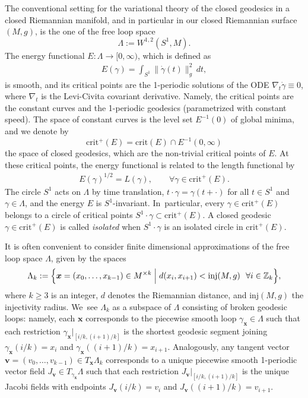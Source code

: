 \documentclass[JEP,XML,SOM,Unicode,NoFloatCountersInSection,published]{cedram}
\let\bm\boldsymbol
\newcommand{\Z}{\mathbb{Z}}
\newcommand{\xx}{\bm{x}}
\newcommand{\vv}{\bm{v}}
\newcommand{\crit}{\mathrm{crit}}
\newcommand{\inj}{\mathrm{inj}}
\theoremstyle{plain}
\theoremstyle{definition}
\begin{document}
The conventional setting for the variational theory of the closed geodesics in a closed Riemannian manifold, and in particular in our closed Riemannian surface $(M,g)$, is the one of the free loop space \[
\Lambda:=W^{1,2}(S^1,M).
\] The energy functional $E:\Lambda\to[0,\infty)$, which is defined as
\begin{align*}
E(\gamma)=\int_{S^1} \|\dot\gamma(t)\|_g^2\,dt,
\end{align*}
is smooth, and its critical points are the 1-periodic solutions of the ODE $\nabla_t\dot\gamma\equiv0$, where $\nabla_t$ is the Levi-Civita covariant derivative. Namely, the critical points are the constant curves and the 1-periodic geodesics (parametrized with constant speed).
The space of constant curves is the level set $E^{-1}(0)$ of global minima, and we denote by \[
\crit^+(E)=\crit(E)\cap E^{-1}(0,\infty)
\] the space of closed geodesics, which are the non-trivial critical points of $E$.
At these critical points, the energy functional is related to the length functional by
\begin{align*}
E(\gamma)^{1/2}=L(\gamma),\qquad\forall \gamma\in\crit^+(E).
\end{align*}
The circle $S^1$ acts on $\Lambda$ by time translation, \ie $t\cdot\gamma=\gamma(t+\cdot)$ for all $t\in S^1$ and $\gamma\in\Lambda$, and the energy $E$ is $S^1$-invariant. In~particular, every $\gamma\in\crit^+(E)$ belongs to a circle of critical points $S^1\cdot\gamma\subset\crit^+(E)$. A closed geodesic $\gamma\in\crit^+(E)$ is called \emph{isolated} when $S^1\cdot\gamma$ is an isolated circle in $\crit^+(E)$.

It is often convenient to consider finite dimensional approximations of the free loop space $\Lambda$, given by the spaces
\begin{align*}
\Lambda_k:=\Big\{ \xx=(x_0,\dots,x_{k-1})\in M^{\times k}\Bigm|d(x_i,x_{i+1})<\inj(M,g)\ \ \forall i\in\Z_k \Big\},
\end{align*}
where $k\geq 3$ is an integer, $d$ denotes the Riemannian distance, and $\inj(M,g)$ the injectivity radius. We~see $\Lambda_k$ as a subspace of $\Lambda$ consisting of broken geodesic loops: namely, each $\xx$ corresponds to the piecewise smooth loop $\gamma_{\xx}\in\Lambda$ such that each restriction $\gamma_{\xx}|_{[i/k,(i+1)/k]}$ is the shortest geodesic segment joining $\gamma_{\xx}(i/k)=x_i$ and $\gamma_{\xx}((i+1)/k)=x_{i+1}$. Analogously, any tangent vector $\vv=(v_0,\dots,v_{k-1})\in T_{\xx}\Lambda_k$ corresponds to a unique piecewise smooth 1-periodic vector field $J_{\vv}\in T_{\gamma_{\xx}}\Lambda$ such that each restriction $J_{\vv}|_{[i/k,(i+1)/k]}$ is the unique Jacobi fields with endpoints $J_{\vv}(i/k)=v_i$ and $J_{\vv}((i+1)/k)=v_{i+1}$.
\end{document}
